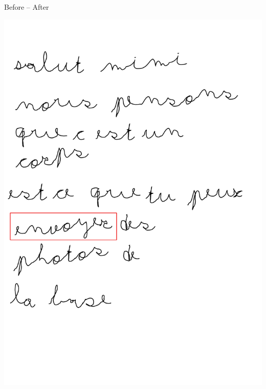\documentclass[compress]{beamer}
\begin{document}
\begin{frame}{Before -- After}
\begin{center}
{            \hspace{1cm}%
        \includegraphics[width=0.43\linewidth]{cowriter/lettre-final-highlight}
        }
    \end{center}
\end{frame}



\end{document}
